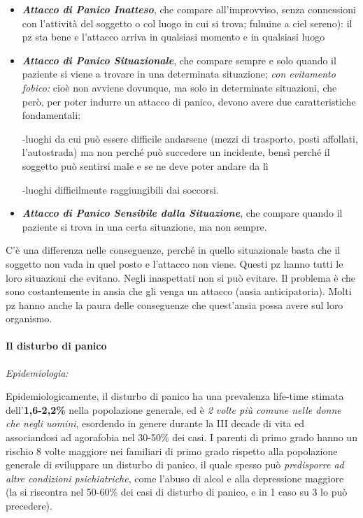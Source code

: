 \begin{itemize}
\item
  \textbf{\emph{Attacco di Panico Inatteso}}, che compare
  all'improvviso, senza connessioni con l'attività del soggetto o col
  luogo in cui si trova; fulmine a ciel sereno): il pz sta bene e
  l'attacco arriva in qualsiasi momento e in qualsiasi luogo
\item
  \textbf{\emph{Attacco di Panico Situazionale}}, che compare sempre e
  solo quando il paziente si viene a trovare in una determinata
  situazione; \emph{con evitamento fobico:} cioè non avviene dovunque,
  ma solo in determinate situazioni, che però, per poter indurre un
  attacco di panico, devono avere due caratteristiche fondamentali:

  -luoghi da cui può essere difficile andarsene (mezzi di trasporto,
  posti affollati, l'autostrada) ma non perché può succedere un
  incidente, bensì perché il soggetto può sentirsi male e se ne deve
  poter andare da lì

  -luoghi difficilmente raggiungibili dai soccorsi.
\item
  \textbf{\emph{Attacco di Panico Sensibile dalla Situazione}}, che
  compare quando il paziente si trova in una certa situazione, ma non
  sempre.
\end{itemize}

C'è una differenza nelle conseguenze, perché in quello situazionale
basta che il soggetto non vada in quel posto e l'attacco non viene.
Questi pz hanno tutti le loro situazioni che evitano. Negli inaspettati
non si può evitare. Il problema è che sono costantemente in ansia che
gli venga un attacco (ansia anticipatoria). Molti pz hanno anche la
paura delle conseguenze che quest'ansia possa avere sul loro organismo.

\paragraph{Il disturbo di panico}

\emph{\emph{Epidemiologia:}}

Epidemiologicamente, il disturbo di panico ha una prevalenza life-time
stimata dell'\textbf{1,6-2,2\%} nella popolazione generale, ed è \emph{2
volte più comune nelle donne che negli uomini}, esordendo in genere
durante la III decade di vita ed associandosi ad agorafobia nel 30-50\%
dei casi. I parenti di primo grado hanno un rischio 8 volte maggiore nei
familiari di primo grado rispetto alla popolazione generale di
sviluppare un disturbo di panico, il quale spesso può \emph{predisporre
ad altre condizioni psichiatriche}, come l'abuso di alcol e alla
depressione maggiore (la si riscontra nel 50-60\% dei casi di disturbo
di panico, e in 1 caso su 3 lo può precedere).

